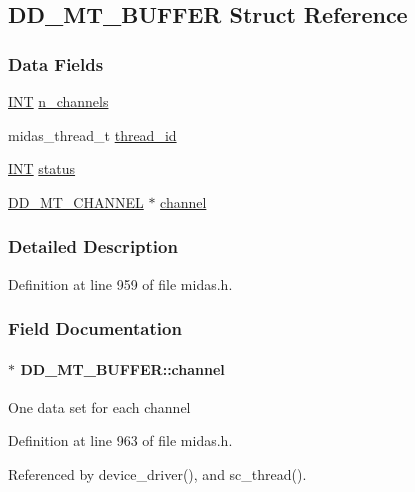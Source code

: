 \subsection{DD\_\-MT\_\-BUFFER Struct Reference}
\label{structDD__MT__BUFFER}
\subsubsection*{Data Fields}
\begin{DoxyCompactItemize}
\item 
\hyperlink{vppg_8h_a392e62da233ed3e2f7c3fd4f487a3896}{INT} \hyperlink{structDD__MT__BUFFER_a39e0e855a040ada9fdf72bebe936541e}{n\_\-channels}
\item 
midas\_\-thread\_\-t \hyperlink{structDD__MT__BUFFER_a423b3c5c3e9c6f3c930341ea61d44fb8}{thread\_\-id}
\item 
\hyperlink{vppg_8h_a392e62da233ed3e2f7c3fd4f487a3896}{INT} \hyperlink{structDD__MT__BUFFER_a039db8f66e6b3f5ed6c3358d6e934bb1}{status}
\item 
\hyperlink{structDD__MT__CHANNEL}{DD\_\-MT\_\-CHANNEL} $\ast$ \hyperlink{structDD__MT__BUFFER_a9a75471f954f8787aa6be021758bcba9}{channel}
\end{DoxyCompactItemize}


\subsubsection{Detailed Description}


Definition at line 959 of file midas.h.

\subsubsection{Field Documentation}
\paragraph[{channel}]{$\ast$ {\bf DD\_\-MT\_\-BUFFER::channel}}\hfill\label{structDD__MT__BUFFER_a9a75471f954f8787aa6be021758bcba9}
One data set for each channel 

Definition at line 963 of file midas.h.

Referenced by device\_\-driver(), and sc\_\-thread().
